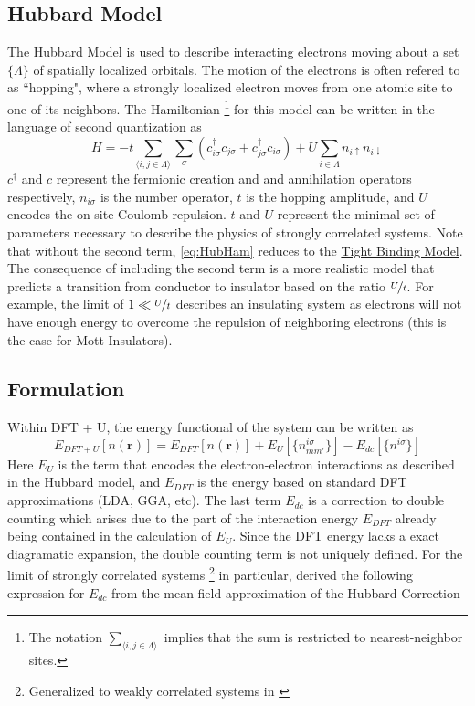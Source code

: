 \documentclass[12pt]{article}
\newcommand{\lrp}[1]{\left( #1 \right)}
\begin{document}
\subsection{Hubbard Model} %
The \href{https://en.wikipedia.org/wiki/Hubbard_model}{Hubbard Model} \cite{Hubmodel} is used to describe interacting electrons moving about a set $\{\Lambda\}$ of spatially localized orbitals. The motion of the electrons is often refered to as ``hopping", where a strongly localized electron moves from one atomic site to one of its neighbors. The Hamiltonian \footnote{The notation $\sum_{\langle i,j\in \Lambda\rangle}$ implies that the sum is restricted to nearest-neighbor sites.} for this model can be written in the language of second quantization as 
\begin{equation}\label{eq:HubHam}
    H = -t\sum_{\langle i,j\in \Lambda\rangle}\sum_{\sigma}\lrp{c^{\dagger}_{i\sigma}c_{j\sigma}+c^{\dagger}_{j\sigma}c_{i\sigma}}+U\sum_{i\in \Lambda}n_{i\uparrow}n_{i\downarrow}
\end{equation}
$c^{\dagger}$ and $c$ represent the fermionic creation and and annihilation operators respectively, $n_{i\sigma}$ is the number operator, $t$ is the hopping amplitude, and $U$ encodes the on-site Coulomb repulsion. $t$ and $U$ represent the minimal set of parameters necessary to describe the physics of strongly correlated systems. Note that without the second term,  \eqref{eq:HubHam} reduces to the \href{https://en.wikipedia.org/wiki/Tight_binding}{Tight Binding Model}. The consequence of including the second term is a more realistic model that predicts a transition from conductor to insulator based on the ratio $\nicefrac{U}{t}$. For example, the limit of $1\ll \nicefrac{U}{t}$ describes an insulating system as electrons will not have enough energy to overcome the repulsion of neighboring electrons (this is the case for Mott Insulators). 

\subsection{Formulation}
Within DFT + U, the energy functional of the system can be written as 
\begin{equation}\label{eq:Edft+u}
    E_{DFT+U}[n(\textbf{r})] = E_{DFT}[n(\textbf{r})] + E_{U}[\{n^{i\sigma}_{mm'}\}]-E_{dc}[\{n^{i\sigma}\}]
\end{equation}
Here $E_U$ is the term that encodes the electron-electron interactions as described in the Hubbard model, and $E_{DFT}$ is the energy based on standard DFT approximations (LDA, GGA, etc). The last term $E_{dc}$ is a correction to double counting which arises due to the part of the interaction energy $E_{DFT}$ already being contained in the calculation of $E_U$. Since the DFT energy lacks a exact diagramatic expansion, the double counting term is not uniquely defined. For the limit of strongly correlated systems \footnote{Generalized to weakly correlated systems in \cite{Edc_general}} in particular, \cite{DFT+Uformulation} derived the following expression for $E_{dc}$ from the mean-field approximation of the Hubbard Correction  
\end{document}
